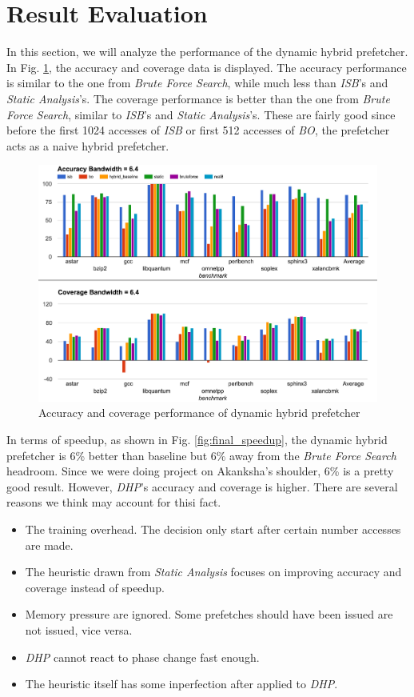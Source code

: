 \section{Result Evaluation}
\label{sec:result}
In this section, we will analyze the performance of the dynamic hybrid prefetcher. In Fig. \ref{fig:final_acc_cov}, the accuracy and coverage data is displayed. The accuracy performance is similar to the one from \emph{Brute Force Search}, while much less than \emph{ISB}'s and \emph{Static Analysis}'s. The coverage performance is better than the one from \emph{Brute Force Search}, similar to \emph{ISB}'s and \emph{Static Analysis}'s. These are fairly good since before the first 1024 accesses of \emph{ISB} or first 512 accesses of \emph{BO}, the prefetcher acts as a naive hybrid prefetcher.

\begin{figure}[ht!]
   \centering
   \includegraphics[width=1.0\textwidth]{images/final_acc_cov.png}
   \caption{Accuracy and coverage performance of dynamic hybrid prefetcher}
   \label{fig:final_acc_cov}
\end{figure}

In terms of speedup, as shown in Fig. \ref{fig:final_speedup}, the dynamic hybrid prefetcher is 6\% better than baseline but 6\% away from the \emph{Brute Force Search} headroom. Since we were doing project on Akanksha's shoulder, 6\% is a pretty good result. However, \emph{DHP}'s accuracy and coverage is higher. There are several reasons we think may account for thisi fact.
\begin{itemize}
  \item The training overhead. The decision only start after certain number accesses are made.
  \item The heuristic drawn from \emph{Static Analysis} focuses on improving accuracy and coverage instead of speedup.
  \item Memory pressure are ignored. Some prefetches should have been issued are not issued, vice versa.
  \item \emph{DHP} cannot react to phase change fast enough.
  \item The heuristic itself has some inperfection after applied to \emph{DHP}.
\end{itemize}

